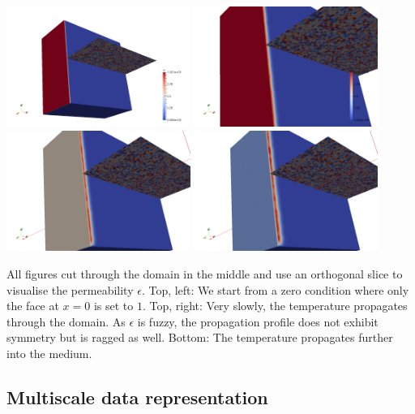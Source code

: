 \begin{center}
  \includegraphics[width=0.45\textwidth]{41_heat-equation/solution00.png}
  \includegraphics[width=0.45\textwidth]{41_heat-equation/solution01.png}
  \includegraphics[width=0.45\textwidth]{41_heat-equation/solution02.png}
  \includegraphics[width=0.45\textwidth]{41_heat-equation/solution03.png}
\end{center}


All figures cut through the domain in the middle and use an orthogonal slice to
visualise the permeability $\epsilon$.
Top, left: We start from a zero condition where only the face at $x=0$ is set to
$1$.
Top, right: Very slowly, the temperature propagates through the domain. As
$\epsilon $ is fuzzy, the propagation profile does not exhibit symmetry but is
ragged as well.
Bottom: The temperature propagates further into the medium.


\subsection{Multiscale data representation}

